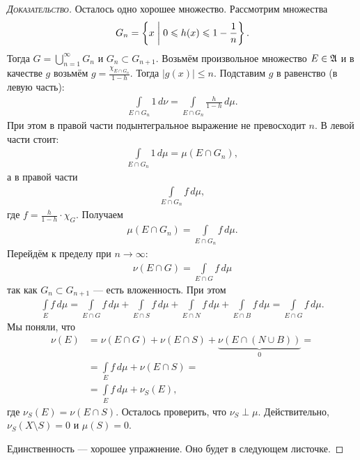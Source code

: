 \begin{proof}[\normalfont\textsc{Доказательство}]
Осталось одно хорошее множество. Рассмотрим множества \begin{align*}
 G_n = \left\{ x \;\middle|\; 0 \leqslant h(x) \leqslant 1 - \frac{1}{n} \right\}
.\end{align*} Тогда $G = \bigcup_{n=1}^{\infty} G_n$ и $G_n \subset G_{n+1}$. Возьмём произвольное множество $E \in \mathfrak{A}$ и в качестве $g$ возьмём $g = \frac{\chi_{E \cap G_n}}{1 - h}$. Тогда $\left| g(x) \right| \leqslant n$. Подставим $g$ в равенство (в левую часть): \begin{align*}
 \int\limits_{E \cap G_n} 1 \, d\nu  = \int\limits_{E \cap G_n} \frac{h}{1-h} \, d\mu  
.\end{align*} При этом в правой части подынтегральное выражение не превосходит $n$. В левой части стоит: \begin{align*}
 \int\limits_{E \cap G_n} 1 \, d\mu  = \mu(E \cap G_n)
,\end{align*} а в правой части \begin{align*}
 \int\limits_{E \cap G_n} f \, d\mu  
,\end{align*} где $f = \frac{h}{1-h} \cdot \chi_{G}$. Получаем \begin{align*}
 \mu(E \cap G_n) = \int\limits_{E \cap G_n} f \, d\mu  
.\end{align*}  Перейдём к пределу при $n \to \infty$: \begin{align*}
\nu(E \cap G) = \int\limits_{E \cap G} f \, d\mu  
\end{align*} так как $G_n \subset G_{n+1}$ --- есть вложенность. При этом \begin{align*}
 \int\limits_{E} f \, d\mu = \int\limits_{E \cap G} f \, d\mu + \int\limits_{E \cap S} f \, d\mu + \int\limits_{E \cap N} f \, d\mu + \int\limits_{E \cap B} f \, d\mu       = \int\limits_{E \cap G} f \, d\mu  
.\end{align*} Мы поняли, что \begin{align*}
\nu(E) &= \nu(E \cap G) + \nu(E \cap S) + \underbrace{\nu(E \cap (N \cup B))}_{0} = \\
 &= \int\limits_{E} f \, d\mu + \nu(E \cap S)  = \\
 &= \int\limits_{E} f \, d\mu + \nu_S(E) 
,\end{align*} где $\nu_S(E) = \nu(E \cap S)$. Осталось проверить, что $\nu_S \perp \mu$. Действительно, $\nu_S(X \setminus S) = 0$ и $\mu(S) = 0$.

Единственность --- хорошее упражнение. Оно будет в следующем листочке.
\end{proof}

